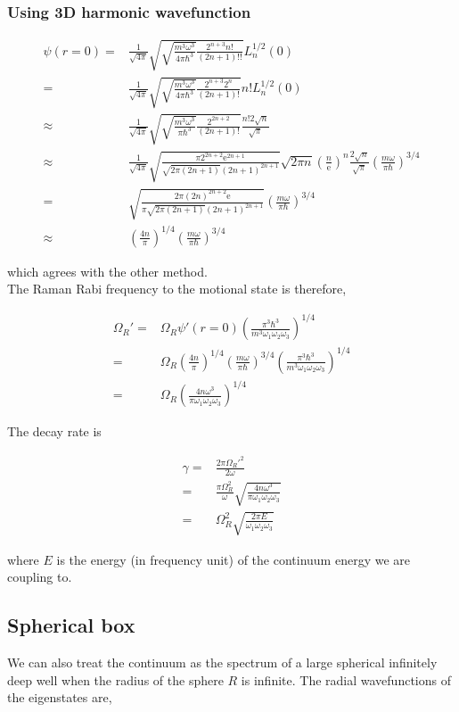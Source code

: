 \documentclass[10pt,fleqn]{article}
\newcommand{\ue}{\mathrm{e}}
\newcommand{\eqar}[1]
{
  \begin{align*}
    #1
  \end{align*}
}
\newcommand{\paren}[1]{{\left({#1}\right)}}
\begin{document}
\subsubsection{Using 3D harmonic wavefunction}
\eqar{
  \psi(r=0)=&\frac{1}{\sqrt{4\pi}}\sqrt{\sqrt{\frac{m^3\omega^3}{4\pi\hbar^3}}\frac{2^{n+3}n!}{(2n+1)!!}}L_n^{1/2}(0)\\
  =&\frac{1}{\sqrt{4\pi}}\sqrt{\sqrt{\frac{m^3\omega^3}{4\pi\hbar^3}}\frac{2^{n+3}2^n}{(2n+1)!}}n!L_n^{1/2}(0)\\
  \approx&\frac{1}{\sqrt{4\pi}}\sqrt{\sqrt{\frac{m^3\omega^3}{\pi\hbar^3}}\frac{2^{2n+2}}{(2n+1)!}}\frac{n! 2\sqrt{n}}{\sqrt{\pi}}\\
  \approx&\frac{1}{\sqrt{4\pi}}\sqrt{\frac{\pi 2^{2n+2}\ue^{2n+1}}{\sqrt{2\pi (2n+1)}(2n+1)^{2n+1}}}\sqrt{2\pi n}\paren{\frac{n}{\ue}}^n\frac{2\sqrt{n}}{\sqrt{\pi}}\paren{\frac{m\omega}{\pi\hbar}}^{3/4}\\
  =&\sqrt{\frac{2\pi (2n)^{2n+2}\ue}{\pi\sqrt{2\pi (2n+1)}(2n+1)^{2n+1}}}\paren{\frac{m\omega}{\pi\hbar}}^{3/4}\\
  \approx&\paren{\frac{4n}{\pi}}^{1/4}\paren{\frac{m\omega}{\pi\hbar}}^{3/4}
}
which agrees with the other method.\\

The Raman Rabi frequency to the motional state is therefore,
\eqar{
  \Omega_R'=&\Omega_R\psi'(r=0)\paren{\frac{\pi^3\hbar^3}{m^3\omega_1\omega_2\omega_3}}^{1/4}\\
  =&\Omega_R\paren{\frac{4n}{\pi}}^{1/4}\paren{\frac{m\omega}{\pi\hbar}}^{3/4}\paren{\frac{\pi^3\hbar^3}{m^3\omega_1\omega_2\omega_3}}^{1/4}\\
  =&\Omega_R\paren{\frac{4n\omega^3}{\pi\omega_1\omega_2\omega_3}}^{1/4}
}
The decay rate is
\eqar{
  \gamma=&\frac{2\pi\Omega_R'^2}{2\omega}\\
  =&\frac{\pi\Omega_R^2}{\omega}\sqrt{\frac{4n\omega^3}{\pi\omega_1\omega_2\omega_3}}\\
  =&\Omega_R^2\sqrt{\frac{2\pi E}{\omega_1\omega_2\omega_3}}
}
where $E$ is the energy (in frequency unit) of the continuum energy we are coupling to.

\subsection{Spherical box}

We can also treat the continuum as the spectrum of a large spherical infinitely deep well
when the radius of the sphere $R$ is infinite.
The radial wavefunctions of the eigenstates are,
\end{document}

